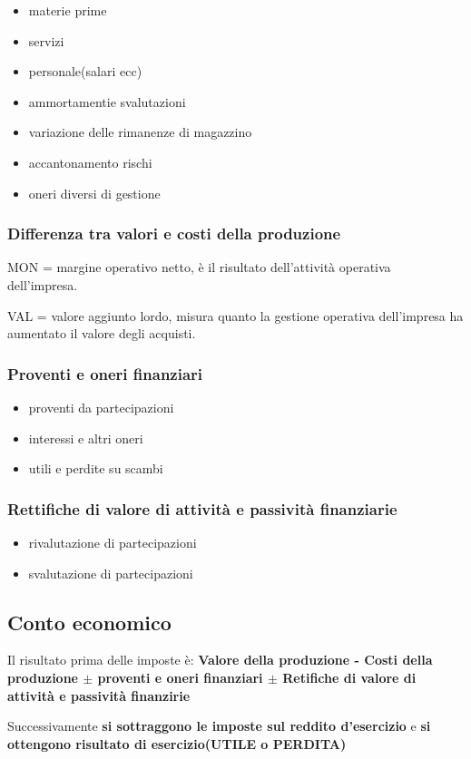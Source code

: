 \begin{itemize}
    \item materie prime
    \item servizi
    \item personale(salari ecc)
    \item ammortamentie svalutazioni
    \item variazione delle rimanenze di magazzino
    \item accantonamento rischi
    \item oneri diversi di gestione
\end{itemize}

\subsubsection{Differenza tra valori e costi della produzione}
MON = margine operativo netto, è il risultato dell'attività operativa dell'impresa.


VAL = valore aggiunto lordo, misura quanto la gestione operativa dell'impresa ha aumentato il valore degli acquisti.

\subsubsection{Proventi e oneri finanziari}
\begin{itemize}
    \item proventi da partecipazioni
    \item interessi e altri oneri
    \item utili e perdite su scambi
\end{itemize}

\subsubsection{Rettifiche di valore di attività e passività finanziarie}
\begin{itemize}
    \item rivalutazione di partecipazioni
    \item svalutazione di partecipazioni
\end{itemize}


\subsection{Conto economico}
Il risultato prima delle imposte è:
\textbf{Valore della produzione - Costi della produzione $\pm$ proventi e oneri finanziari $\pm$ Retifiche di valore di attività e passività finanzirie
}

Successivamente \textbf{si sottraggono le imposte sul reddito d'esercizio} e \textbf{si ottengono
risultato di esercizio(UTILE o PERDITA)} 

